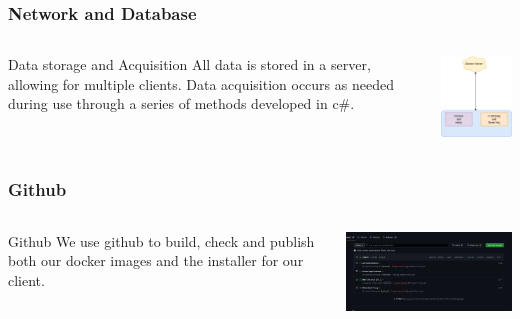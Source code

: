 \documentclass[aspectratio=169]{beamer}
\begin{document}
\begin{frame}
    \frametitle{Network and Database}

    \begin{columns}
        \begin{column}{0.48\textwidth}
            \begin{block}{Data storage and Acquisition}
                All data is stored in a server, allowing for multiple clients. Data acquisition occurs as needed during use through a series of methods developed in c\#.
            \end{block}
        \end{column}
        \begin{column}{0.48\textwidth}
            \includegraphics[width=5cm]{Simple Diagram.png}
        \end{column}
    \end{columns}
\end{frame}

\begin{frame}
    \frametitle{Github}

    \begin{columns}
        \begin{column}{0.28\textwidth}
            \begin{block}{Github}
                We use github to build, check and publish both our docker images and the installer for our client.
            \end{block}
        \end{column}
        \begin{column}{0.58\textwidth}
            \includegraphics[width=9cm]{github.png}
        \end{column}
    \end{columns}
\end{frame}
\end{document}
